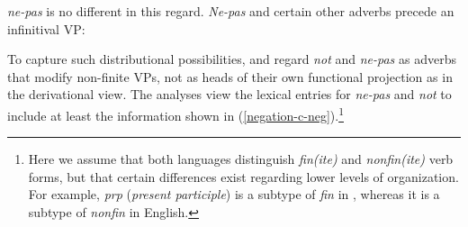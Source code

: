 \documentclass[output=paper
	        ,collection
	        ,collectionchapter
 	        ,biblatex
                ,babelshorthands
                ,newtxmath
                ,draftmode
                ,colorlinks, citecolor=brown
]{langscibook}
\begin{document}
\begin{exe}
\begin{xlist}
\begin{exe}
\begin{xlist}
\eal\label{negation-31}
\zl

\noindent
{} \textit{ne-pas} is no different in this regard.  \textit{Ne-pas} and
certain other adverbs precede an infinitival VP:

\eal
{}
\zl

To capture such distributional possibilities, \citet{Kim:00} and \citet{KS:02} regard \textit{not} and \textit{ne-pas} as adverbs that modify
non-finite VPs, not as  heads of their own functional projection as in the derivational view. The
analyses view the lexical entries for \textit{ne-pas} and \textit{not} to include at
least the
information shown in (\ref{negation-c-neg}).\footnote{Here we assume that both languages
distinguish \textit{fin(ite)} and \textit{nonfin(ite)} verb forms, but that
certain differences exist regarding lower levels of organization. For example,
\textit{prp} (\textit{present participle}) is a subtype of \textit{fin} in ,
whereas it is a subtype of \textit{nonfin} in English.}

%


\end{xlist}
\end{exe}
\end{xlist}
\end{exe}
\end{document}
